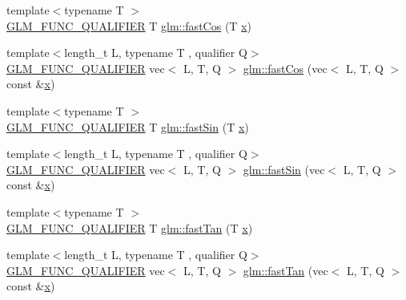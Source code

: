 \begin{DoxyCompactItemize}
\item 
{\footnotesize template$<$typename T $>$ }\\\mbox{\hyperlink{setup_8hpp_a33fdea6f91c5f834105f7415e2a64407}{G\+L\+M\+\_\+\+F\+U\+N\+C\+\_\+\+Q\+U\+A\+L\+I\+F\+I\+ER}} T \mbox{\hyperlink{group__gtx__fast__trigonometry_gab34c8b45c23c0165a64dcecfcc3b302a}{glm\+::fast\+Cos}} (T \mbox{\hyperlink{_s_d_l__opengl_8h_ad0e63d0edcdbd3d79554076bf309fd47}{x}})
\item 
{\footnotesize template$<$length\+\_\+t L, typename T , qualifier Q$>$ }\\\mbox{\hyperlink{setup_8hpp_a33fdea6f91c5f834105f7415e2a64407}{G\+L\+M\+\_\+\+F\+U\+N\+C\+\_\+\+Q\+U\+A\+L\+I\+F\+I\+ER}} vec$<$ L, T, Q $>$ \mbox{\hyperlink{namespaceglm_a3a4a9ffb43805a0d99dc508beeeaf4be}{glm\+::fast\+Cos}} (vec$<$ L, T, Q $>$ const \&\mbox{\hyperlink{_s_d_l__opengl_8h_ad0e63d0edcdbd3d79554076bf309fd47}{x}})
\item 
{\footnotesize template$<$typename T $>$ }\\\mbox{\hyperlink{setup_8hpp_a33fdea6f91c5f834105f7415e2a64407}{G\+L\+M\+\_\+\+F\+U\+N\+C\+\_\+\+Q\+U\+A\+L\+I\+F\+I\+ER}} T \mbox{\hyperlink{group__gtx__fast__trigonometry_ga0aab3257bb3b628d10a1e0483e2c6915}{glm\+::fast\+Sin}} (T \mbox{\hyperlink{_s_d_l__opengl_8h_ad0e63d0edcdbd3d79554076bf309fd47}{x}})
\item 
{\footnotesize template$<$length\+\_\+t L, typename T , qualifier Q$>$ }\\\mbox{\hyperlink{setup_8hpp_a33fdea6f91c5f834105f7415e2a64407}{G\+L\+M\+\_\+\+F\+U\+N\+C\+\_\+\+Q\+U\+A\+L\+I\+F\+I\+ER}} vec$<$ L, T, Q $>$ \mbox{\hyperlink{namespaceglm_a096bd67e1f2c815e9398d960fef0df83}{glm\+::fast\+Sin}} (vec$<$ L, T, Q $>$ const \&\mbox{\hyperlink{_s_d_l__opengl_8h_ad0e63d0edcdbd3d79554076bf309fd47}{x}})
\item 
{\footnotesize template$<$typename T $>$ }\\\mbox{\hyperlink{setup_8hpp_a33fdea6f91c5f834105f7415e2a64407}{G\+L\+M\+\_\+\+F\+U\+N\+C\+\_\+\+Q\+U\+A\+L\+I\+F\+I\+ER}} T \mbox{\hyperlink{group__gtx__fast__trigonometry_gaf29b9c1101a10007b4f79ee89df27ba2}{glm\+::fast\+Tan}} (T \mbox{\hyperlink{_s_d_l__opengl_8h_ad0e63d0edcdbd3d79554076bf309fd47}{x}})
\item 
{\footnotesize template$<$length\+\_\+t L, typename T , qualifier Q$>$ }\\\mbox{\hyperlink{setup_8hpp_a33fdea6f91c5f834105f7415e2a64407}{G\+L\+M\+\_\+\+F\+U\+N\+C\+\_\+\+Q\+U\+A\+L\+I\+F\+I\+ER}} vec$<$ L, T, Q $>$ \mbox{\hyperlink{namespaceglm_ab77424475017f729a5b8a97c2eb9d0d1}{glm\+::fast\+Tan}} (vec$<$ L, T, Q $>$ const \&\mbox{\hyperlink{_s_d_l__opengl_8h_ad0e63d0edcdbd3d79554076bf309fd47}{x}})

\end{DoxyCompactItemize}
